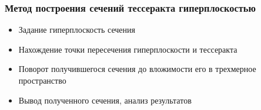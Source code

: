 \documentclass[10pt,pdf,hyperref={unicode}]{beamer}
\begin{document}
\begin{frame}
\begin{columns}
	\end{columns}
\end{frame}
\begin{frame}
	\frametitle{Метод построения сечений тессеракта гиперплоскостью}
	\begin{itemize}
		\item Задание гиперплоскость сечения
		\item Нахождение точки пересечения гиперплоскости и тессеракта
		\item Поворот получившегося сечения до вложимости его в трехмерное пространство
		\item Вывод полученного сечения, анализ результатов
	\end{itemize}
\end{frame}
\end{document}

